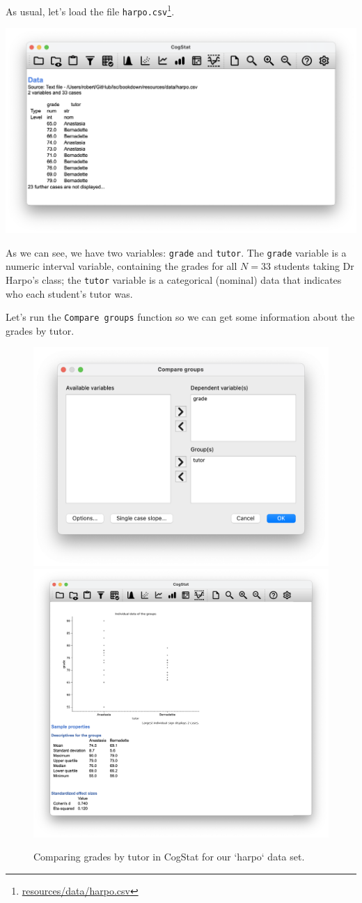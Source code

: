 \documentclass[
  11pt,
  a4paper,
  twoside,symmetric,openright]{book}
\theoremstyle{break}
\theoremstyle{break}
\DeclareRobustCommand{\href}[2]{#2\footnote{\url{#1}}}
\begin{document}
As usual, let's load the file \href{resources/data/harpo.csv}{\texttt{harpo.csv}}.

\begin{center}\includegraphics[width=0.6\linewidth]{resources/image/cogstatloadharpo} \end{center}

As we can see, we have two variables: \texttt{grade} and \texttt{tutor}. The \texttt{grade} variable is a numeric interval variable, containing the grades for all \(N = 33\) students taking Dr Harpo's class; the \texttt{tutor} variable is a categorical (nominal) data that indicates who each student's tutor was.

Let's run the \texttt{Compare\ groups} function so we can get some information about the grades by tutor.

\begin{figure}

{\centering \includegraphics[width=0.6\linewidth]{resources/image/cogstatharpocomparedialog} \includegraphics[width=0.6\linewidth]{resources/image/cogstatharposampleproperties} 

}

\caption{Comparing grades by tutor in CogStat for our `harpo` data set.}\label{fig:harpocompare}
\end{figure}
\end{document}
